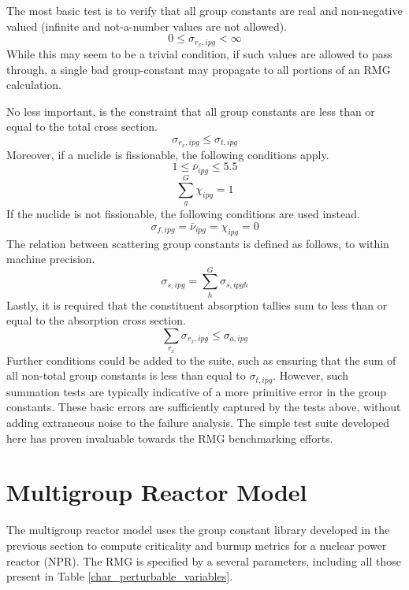 The most basic test is to verify that all group constants are real and non-negative valued 
(infinite and not-a-number values are not allowed).  
\begin{equation}
\label{nn_ut}
0 \le \sigma_{r_x,ipg} < \infty
\end{equation}
While this may seem to be a trivial 
condition, if such values are allowed to pass through, a single bad group-constant may 
propagate to all portions of an RMG calculation.

No less important, is the constraint that all group constants are less than or equal to 
the total cross section.
\begin{equation}
\label{tot_xs_ut}
\sigma_{r_x,ipg} \le \sigma_{t,ipg}
\end{equation}
Moreover, if a nuclide is fissionable, the following conditions apply.
\begin{equation}
\label{nu_fiss_ut}
1 \le \bar{\nu}_{ipg} \le 5.5
\end{equation}
\begin{equation}
\label{chi_fiss_ut}
\sum_g^G \chi_{ipg} = 1
\end{equation}
If the nuclide is not fissionable, the following conditions are used instead.
\begin{equation}
\label{not_fiss_ut}
\sigma_{f,ipg} = \bar{\nu}_{ipg} = \chi_{ipg} = 0
\end{equation}
The relation between scattering group constants is defined as follows, to 
within machine precision.
\begin{equation}
\label{scat_xs_ut}
\sigma_{s,ipg} = \sum_h^G \sigma_{s,ipgh}
\end{equation}
Lastly, it is required that the constituent absorption tallies sum 
to less than or equal to the absorption cross section.
\begin{equation}
\label{scat_xs_ut}
\sum_{r_x} \sigma_{r_x,ipg} \le \sigma_{a,ipg}
\end{equation}
Further conditions could be added to the suite, such as ensuring that the sum of 
all non-total group constants is less than equal to $\sigma_{t,ipg}$.  However, 
such summation tests are typically indicative of a more primitive error in the 
group constants.  These basic errors are sufficiently captured by the tests above, 
without adding extraneous noise to the failure analysis.  The simple test suite developed
here has proven invaluable towards the RMG benchmarking efforts.




\section{Multigroup Reactor Model}
\label{mg_sec:rmg_model}
The multigroup reactor model uses the group constant library developed in the previous 
section to compute criticality and burnup metrics for a nuclear power reactor (NPR).
The RMG is specified by a several parameters, including all those present in Table
\ref{char_perturbable_variables}.


